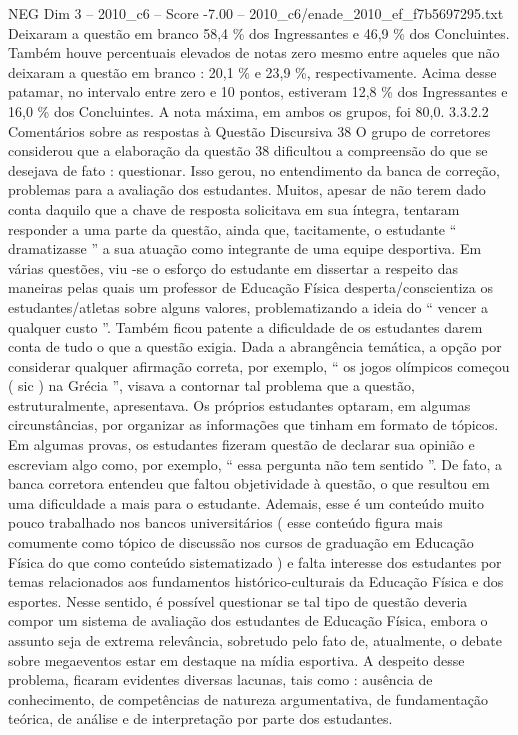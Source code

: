 \begin{textsample}{NEG Dim 3 – 2010\_c6 – Score -7.00 – 2010\_c6/enade\_2010\_ef\_f7b5697295.txt}
Deixaram a questão em branco 58,4 \% dos Ingressantes e 46,9 \% dos Concluintes.
Também houve percentuais elevados de notas zero mesmo entre aqueles que não deixaram a questão em branco : 20,1 \% e 23,9 \%, respectivamente.
Acima desse patamar, no intervalo entre zero e 10 pontos, estiveram 12,8 \% dos Ingressantes e 16,0 \% dos Concluintes.
A nota máxima, em ambos os grupos, foi 80,0. 3.3.2.2 Comentários sobre as respostas à Questão Discursiva 38 O grupo de corretores considerou que a elaboração da questão 38 dificultou a compreensão do que se desejava de fato : questionar.
Isso gerou, no entendimento da banca de correção, problemas para a avaliação dos estudantes.
Muitos, apesar de não terem dado conta daquilo que a chave de resposta solicitava em sua íntegra, tentaram responder a uma parte da questão, ainda que, tacitamente, o estudante “ dramatizasse ” a sua atuação como integrante de uma equipe desportiva.
Em várias questões, viu -se o esforço do estudante em dissertar a respeito das maneiras pelas quais um professor de Educação Física desperta/conscientiza os estudantes/atletas sobre alguns valores, problematizando a ideia do “ vencer a qualquer custo ”.
Também ficou patente a dificuldade de os estudantes darem conta de tudo o que a questão exigia.
Dada a abrangência temática, a opção por considerar qualquer afirmação correta, por exemplo, “ os jogos olímpicos começou ( sic ) na Grécia ”, visava a contornar tal problema que a questão, estruturalmente, apresentava.
Os próprios estudantes optaram, em algumas circunstâncias, por organizar as informações que tinham em formato de tópicos.
Em algumas provas, os estudantes fizeram questão de declarar sua opinião e escreviam algo como, por exemplo, “ essa pergunta não tem sentido ”.
De fato, a banca corretora entendeu que faltou objetividade à questão, o que resultou em uma dificuldade a mais para o estudante.
Ademais, esse é um conteúdo muito pouco trabalhado nos bancos universitários ( esse conteúdo figura mais comumente como tópico de discussão nos cursos de graduação em Educação Física do que como conteúdo sistematizado ) e falta interesse dos estudantes por temas relacionados aos fundamentos histórico-culturais da Educação Física e dos esportes.
Nesse sentido, é possível questionar se tal tipo de questão deveria compor um sistema de avaliação dos estudantes de Educação Física, embora o assunto seja de extrema relevância, sobretudo pelo fato de, atualmente, o debate sobre megaeventos estar em destaque na mídia esportiva.
A despeito desse problema, ficaram evidentes diversas lacunas, tais como : ausência de conhecimento, de competências de natureza argumentativa, de fundamentação teórica, de análise e de interpretação por parte dos estudantes.

\end{textsample}
